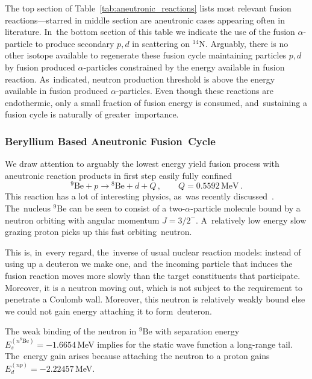 \documentclass[particles,article,accept,pdftex,moreauthors]{Definitions/mdpi}
\begin{document}
The top section of Table~\ref{tab:aneutronic_reactions} lists most relevant fusion reactions---starred in middle section are aneutronic cases appearing often in literature. In~the bottom section of this table we indicate the use of the fusion $\alpha$-particle to produce secondary $p,d$ in scattering on ${}^{14}\mathrm{N}$. Arguably, there is no other isotope available to regenerate these fusion cycle maintaining particles $p,d$ by fusion produced $\alpha$-particles constrained by the energy available in fusion reaction. As~indicated, neutron production threshold is above the energy available in fusion produced $\alpha$-particles. Even though these reactions are endothermic, only a small fraction of fusion energy is consumed, and~sustaining a fusion cycle is naturally of greater~importance. 

\subsubsection{Beryllium Based Aneutronic Fusion~Cycle} \label{ssec:Beryl}
We draw attention to arguably the lowest energy yield fusion process with aneutronic reaction products in first step easily fully confined
\begin{equation}
^9\mathrm{Be}+p\to\! ^8\mathrm{Be}+d + Q \,,\qquad Q=0.5592\,\mathrm{MeV}\,.
\label{eq:9Bep-8Ben}
\end{equation}
This reaction has a lot of interesting physics, as~was recently discussed~\cite{Rafelski:2025uio}. The~nucleus ${}^9\mathrm{Be}$ can be seen to consist of a two-$\alpha$-particle molecule bound by a neutron orbiting with angular momentum $J=3/2^-$. A~relatively low energy slow grazing proton picks up this fast orbiting~neutron.

This is, in~every regard, the~inverse of usual nuclear reaction models: instead of using up a deuteron we make one, and~the incoming particle that induces the fusion reaction moves more slowly than the target constituents that participate. Moreover, it is a neutron moving out, which is not subject to the requirement to penetrate a Coulomb wall. Moreover, this neutron is relatively weakly bound else we could not gain energy attaching it to form~deuteron.

The weak binding of the neutron in ${}^9\mathrm{Be}$ with separation energy $E_s^{(n^8\mathrm{Be})}=-1.6654$\,MeV implies for the static wave function a long-range tail. The~energy gain arises because attaching the neutron to a proton gains $E_d^{(np)}=-2.22457$\,MeV.
\end{document}
